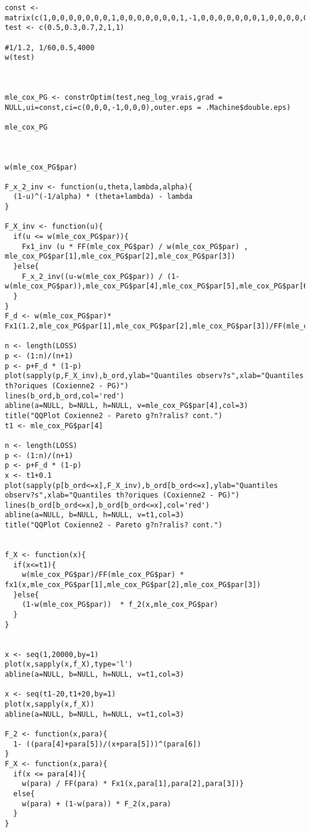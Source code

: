 \begin{verbatim}
const <- matrix(c(1,0,0,0,0,0,0,0,1,0,0,0,0,0,0,0,1,-1,0,0,0,0,0,0,0,1,0,0,0,0,0,0,0,1,0,0,0,0,0,0,0,1),7,6)
test <- c(0.5,0.3,0.7,2,1,1)

#1/1.2, 1/60,0.5,4000
w(test)



mle_cox_PG <- constrOptim(test,neg_log_vrais,grad = NULL,ui=const,ci=c(0,0,0,-1,0,0,0),outer.eps = .Machine$double.eps)

mle_cox_PG



w(mle_cox_PG$par)

F_x_2_inv <- function(u,theta,lambda,alpha){
  (1-u)^(-1/alpha) * (theta+lambda) - lambda
}

F_X_inv <- function(u){
  if(u <= w(mle_cox_PG$par)){
    Fx1_inv (u * FF(mle_cox_PG$par) / w(mle_cox_PG$par) , mle_cox_PG$par[1],mle_cox_PG$par[2],mle_cox_PG$par[3])
  }else{
    F_x_2_inv((u-w(mle_cox_PG$par)) / (1-w(mle_cox_PG$par)),mle_cox_PG$par[4],mle_cox_PG$par[5],mle_cox_PG$par[6])
  }
}
F_d <- w(mle_cox_PG$par)* Fx1(1.2,mle_cox_PG$par[1],mle_cox_PG$par[2],mle_cox_PG$par[3])/FF(mle_cox_PG$par)

n <- length(LOSS)
p <- (1:n)/(n+1)
p <- p+F_d * (1-p)
plot(sapply(p,F_X_inv),b_ord,ylab="Quantiles observ?s",xlab="Quantiles th?oriques (Coxienne2 - PG)")
lines(b_ord,b_ord,col='red')
abline(a=NULL, b=NULL, h=NULL, v=mle_cox_PG$par[4],col=3)
title("QQPlot Coxienne2 - Pareto g?n?ralis? cont.")
t1 <- mle_cox_PG$par[4]

n <- length(LOSS)
p <- (1:n)/(n+1)
p <- p+F_d * (1-p)
x <- t1+0.1
plot(sapply(p[b_ord<=x],F_X_inv),b_ord[b_ord<=x],ylab="Quantiles observ?s",xlab="Quantiles th?oriques (Coxienne2 - PG)")
lines(b_ord[b_ord<=x],b_ord[b_ord<=x],col='red')
abline(a=NULL, b=NULL, h=NULL, v=t1,col=3)
title("QQPlot Coxienne2 - Pareto g?n?ralis? cont.")


f_X <- function(x){
  if(x<=t1){
    w(mle_cox_PG$par)/FF(mle_cox_PG$par) * fx1(x,mle_cox_PG$par[1],mle_cox_PG$par[2],mle_cox_PG$par[3])
  }else{
    (1-w(mle_cox_PG$par))  * f_2(x,mle_cox_PG$par)
  }
}


x <- seq(1,20000,by=1)
plot(x,sapply(x,f_X),type='l')
abline(a=NULL, b=NULL, h=NULL, v=t1,col=3)

x <- seq(t1-20,t1+20,by=1)
plot(x,sapply(x,f_X))
abline(a=NULL, b=NULL, h=NULL, v=t1,col=3)

F_2 <- function(x,para){
  1- ((para[4]+para[5])/(x+para[5]))^(para[6])
}
F_X <- function(x,para){
  if(x <= para[4]){
    w(para) / FF(para) * Fx1(x,para[1],para[2],para[3])}
  else{
    w(para) + (1-w(para)) * F_2(x,para)
  }
}


\end{verbatim}
